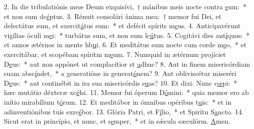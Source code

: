 2. In die tribulatiónis meæ Deum exquisívi,~† mánibus meis nocte contra \uline{e}um:~* et non sum dc\uline{é}ptus.
3. Rénuit consolári ánima mea:~† memor fui Dei, et delectátus sum, et exercit\uline{á}tus sum:~* et defécit spírits m\uline{e}us.
4. Anticipavérunt vigílias óculi m\uline{e}i:~* turbátus sum, et non sum lc\uline{ú}tus.
5. Cogitávi dies ant\uline{í}quos:~* et annos ætérnos in mente hb\uline{u}i.
6. Et meditátus sum nocte cum corde m\uline{e}o,~* et exercitábar, et scopébam spíritm m\uline{e}um.
7. Numquid in ætérnum projíciet D\uline{e}us:~* aut non appónet ut complacítior st \uline{a}dhuc?
8. Aut in finem misericórdiam suam absc\uline{í}ndet,~* a generatióne in generat\uline{ó}nem?
9. Aut obliviscétur miseréri D\uline{e}us:~* aut continébit in ira sua misericórdis s\uline{u}as?
10. Et dixi: Nunc c\uline{œ}pi:~* hæc mutátio déxteræ xc\uline{é}lsi.
11. Memor fui óperum D\uline{ó}mini:~* quia memor ero ab inítio mirabílium t\uline{ó}rum.
12. Et meditábor in ómnibus opéribus t\uline{u}is:~* et in adinventiónibus tuis exrc\uline{é}bor.
13. Glória Patri, et F\uline{í}lio,~* et Spirítu S\uline{a}ncto.
14. Sicut erat in princípio, et nunc, et s\uline{e}mper,~* et in sǽcula sæculórm. \uline{A}men.

